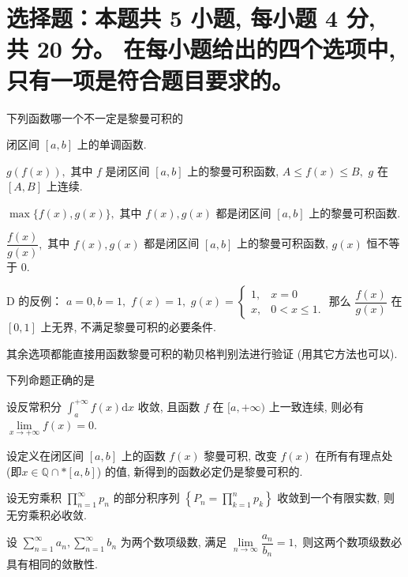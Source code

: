 \fi


\section{%
  选择题：本题共 5 小题, 每小题 4 分, 共 20 分。
  在每小题给出的四个选项中, 只有一项是符合题目要求的。
}


\begin{question}
下列函数哪一个不一定是黎曼可积的 \paren[D]

\begin{choices}
\item 闭区间 $[a, b]$ 上的单调函数.
\item $g(f(x)),$ 其中 $f$ 是闭区间 $[a, b]$ 上的黎曼可积函数, $A \leqslant f(x) \leqslant B,$ $g$ 在 $[A, B]$ 上连续.
\item $\max\{f(x), g(x)\},$ 其中 $f(x), g(x)$ 都是闭区间 $[a, b]$ 上的黎曼可积函数.
\item $\dfrac{f(x)}{g(x)},$ 其中 $f(x), g(x)$ 都是闭区间 $[a, b]$ 上的黎曼可积函数, $g(x)$ 恒不等于 $0.$
\end{choices}
\end{question}

\begin{solution}
D 的反例： $a = 0, b = 1,$ $f(x) = 1,$ $g(x) = \begin{cases}
1, & x = 0 \\ x, & 0 < x \leqslant 1.
\end{cases}$ 那么 $\dfrac{f(x)}{g(x)}$ 在 $[0, 1]$ 上无界, 不满足黎曼可积的必要条件.

其余选项都能直接用函数黎曼可积的勒贝格判别法进行验证 (用其它方法也可以).
\end{solution}

\begin{question}
下列命题正确的是 \paren[A]

\begin{choices}
\item 设反常积分 $\int_a^{+\infty} f(x) \mathrm{d} x$ 收敛, 且函数 $f$ 在 $[a, +\infty)$ 上一致连续, 则必有 $\lim\limits_{x \to +\infty} f(x) = 0.$
\item 设定义在闭区间 $[a, b]$ 上的函数 $f(x)$ 黎曼可积, 改变 $f(x)$ 在所有有理点处 (即$x \in \mathbb{Q} \cap* [a, b]$) 的值, 新得到的函数必定仍是黎曼可积的.
\item 设无穷乘积 $\prod\limits_{n=1}^{\infty} p_n$ 的部分积序列 $\left\{ P_n = \prod\limits_{k=1}^{n} p_k \right\}$ 收敛到一个有限实数, 则无穷乘积必收敛.
\item 设 $\sum\limits_{n=1}^{\infty} a_n, \sum\limits_{n=1}^{\infty} b_n$ 为两个数项级数, 满足 $\lim\limits_{n\to\infty} \dfrac{a_n}{b_n} = 1,$ 则这两个数项级数必具有相同的敛散性.
\end{choices}
\end{question}

